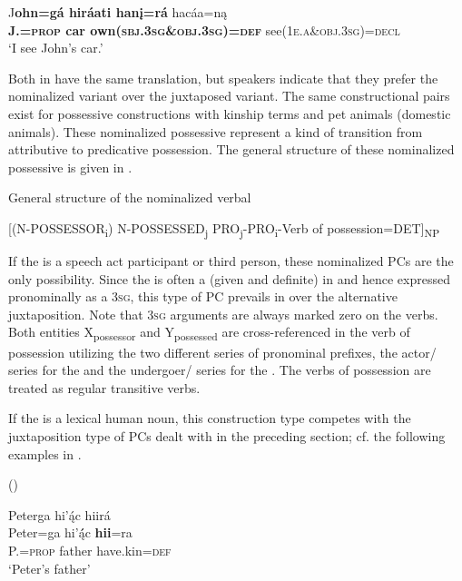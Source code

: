 \documentclass[output=paper]{LSP/langsci}
\begin{document}
\ex 
\gll J\textbf{ohn=g\'a hir\'aati han\k{i}=r\'a} hac\'aa=n\k{a}  \\
\textbf{J.=\textsc{prop} car own(\textsc{sbj.3sg}\&\textsc{obj.3sg})=\textsc{def}} see(\textsc{1e.a}\&\textsc{obj.3sg})=\textsc{decl}  \\
\glt `I see John's car.'
\z
\z 

Both  in  have the same translation, but speakers indicate that they prefer the nominalized variant over the juxtaposed variant. The same constructional pairs exist for possessive constructions with kinship terms and pet animals (domestic animals). These nominalized possessive  represent a kind of transition from attributive to predicative possession. The general structure of these nominalized possessive  is given in .

\ea General structure of the nominalized verbal  \label{generalstructure}

[(N-POSSESSOR\textsubscript{i})  N-POSSESSED\textsubscript{j}    PRO\textsubscript{j}-PRO\textsubscript{i}-Verb of possession=DET]\textsubscript{NP}
\z

If the  is a speech act participant or third person, these nominalized PCs are the only possibility. Since the  is often a  (given and definite) in  and hence expressed pronominally as a \textsc{3sg}, this type of PC prevails in  over the alternative juxtaposition. Note that \textsc{3sg} arguments are always marked zero on the verbs. Both entities X\textsubscript{possessor} and Y\textsubscript{possessed} are cross-referenced in the verb of possession utilizing the two different series of pronominal prefixes, the actor/ series for the  and the undergoer/ series for the . The verbs of possession are treated as regular transitive verbs.

If the  is a lexical human noun, this construction type competes with the juxtaposition type of PCs dealt with in the preceding section; cf. the following examples in .
 
\ea {} (\citealt[16]{Helmbrecht2003}) \label{petersthings}

\ea 
\glll Peterga hi'ą́c hiirá \\
Peter=ga        hi’ą́́c   \textbf{hii}=ra \\
P.=\textsc{prop}  father have.kin=\textsc{def} \\
\glt `Peter's father'
\end{document}

